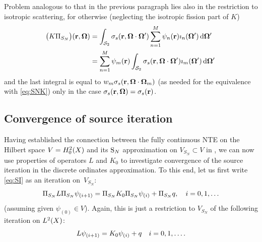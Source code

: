 Problem analogous to that in the previous paragraph lies also in the restriction to isotropic scattering, for otherwise
(neglecting the isotropic fission part of $K$) 
$$
	\begin{aligned}
		\bigl(K\Projop[S_N]\bigr)(\br,\bomega) &= \intA[']{\sigma_s(\br,\bomega\cdot\bomega')\sum_{n=1}^M
		\psi_n(\br)\imath_n(\bomega')}\\
		&= \sum_{n=1}^M \psi_m(\br)\intA[']{\sigma_s(\br,\bomega\cdot\bomega')\imath_m(\bomega')}
	\end{aligned}
$$
and the last integral is equal to $w_m \sigma_s(\br,\bomega\cdot\bomega_m)$ (as needed for the equivalence with
\eqref{eq:SNK}) only in the case $\sigma_s(\br,\bomega) = \sigma_s(\br)$.
 
\subsection{Convergence of source iteration} \label{sec:SI}
Having established the connection between the fully continuous NTE on the Hilbert space $V = \Hpnot[2](X)$ and its $\SN$
approximation on $V_{S_N} \subset V$ in , we can now use properties of operators $L$ and $K_0$ to
investigate convergence of the source iteration in the discrete ordinates approximation. To this end, let us first write
\eqref{eq:SI} as an iteration on~$V_{S_N}$:
\begin{equation}\label{eq:SISN}
	\Projop[S_N] \op{L} \Projop[S_N] \psi_{(i+1)} = \Projop[S_N] \op{K}_0 \Projop[S_N] \psi_{(i)} +  \Projop[S_N] q,\quad
	i = 0,1,\ldots 
\end{equation}
(assuming given $\psi_{(0)} \in V$).
Again, this is just a restriction to $V_{S_N}$ of the following iteration on $\Lp[2](X)$:
\begin{equation}\label{eq:SIhilbert}
	\op{L} \psi_{(i+1)} = \op{K}_0 \psi_{(i)} + q  \quad i = 0,1,\ldots.
\end{equation}

